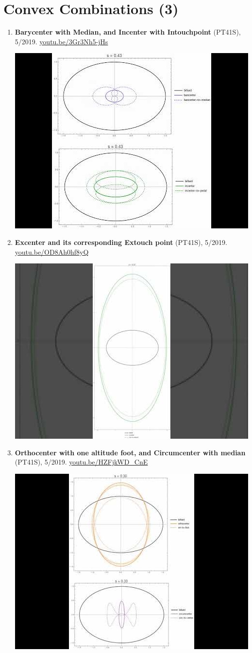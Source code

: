 \documentclass[12pt]{article}
\begin{document}
\section{Convex Combinations (3)}

\begin{enumerate}[resume]
\item \textbf{Barycenter with Median, and Incenter with Intouchpoint} (PT41S), 5/2019. \href{https://youtu.be/3Gr3Nh5-jHs}{\url{youtu.be/3Gr3Nh5-jHs}}
\begin{center}\includegraphics[width=.5\textwidth]{pics/3Gr3Nh5-jHs.jpg}\end{center}
% 
\item \textbf{Excenter and its corresponding Extouch point} (PT41S), 5/2019. \href{https://youtu.be/OD8Ah0hf8yQ}{\url{youtu.be/OD8Ah0hf8yQ}}
\begin{center}\includegraphics[width=.5\textwidth]{pics/OD8Ah0hf8yQ.jpg}\end{center}
% 
\item \textbf{Orthocenter with one altitude foot, and Circumcenter with median} (PT41S), 5/2019. \href{https://youtu.be/HZFjkWD_CnE}{\url{youtu.be/HZFjkWD\_CnE}}
\begin{center}\includegraphics[width=.5\textwidth]{pics/HZFjkWD_CnE.jpg}\end{center}
% 
\end{enumerate}
\end{document}
